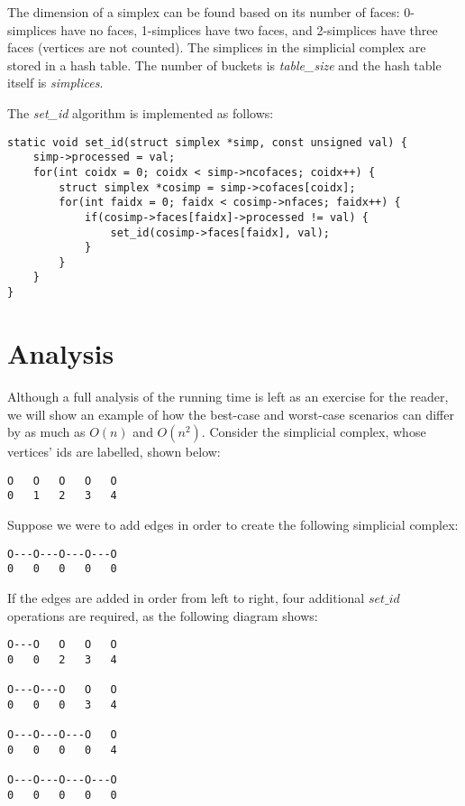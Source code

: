 \documentclass{article}
\begin{document}
The dimension of a simplex can be found based on its number of
faces:
0-simplices have no faces, 1-simplices have two faces, and
2-simplices have three faces (vertices are not counted).
The simplices in the simplicial complex are stored in a hash table.
The number of buckets is \emph{table\_size} and the hash table
itself is \emph{simplices}.

The \emph{set\_id} algorithm is implemented as follows:
\begin{verbatim}
static void set_id(struct simplex *simp, const unsigned val) {
    simp->processed = val;
    for(int coidx = 0; coidx < simp->ncofaces; coidx++) {
        struct simplex *cosimp = simp->cofaces[coidx];
        for(int faidx = 0; faidx < cosimp->nfaces; faidx++) {
            if(cosimp->faces[faidx]->processed != val) {
                set_id(cosimp->faces[faidx], val);
            }
        }
    }
}
\end{verbatim}

\section{Analysis}
Although a full analysis of the running time is left as an exercise
for the reader, we will show an example of how the best-case and
worst-case scenarios can differ by as much as $O(n)$ and $O(n^2)$.
Consider the simplicial complex, whose vertices' ids are labelled,
shown below:

\begin{verbatim}
O   O   O   O   O
0   1   2   3   4
\end{verbatim}

Suppose we were to add edges in order to create
the following simplicial complex:

\begin{verbatim}
O---O---O---O---O
0   0   0   0   0
\end{verbatim}

If the edges are added in order from left to right, four
additional $set\_id$ operations are required, as the
following diagram shows:

\begin{verbatim}
O---O   O   O   O
0   0   2   3   4

O---O---O   O   O
0   0   0   3   4

O---O---O---O   O
0   0   0   0   4

O---O---O---O---O
0   0   0   0   0
\end{verbatim}
\end{document}

